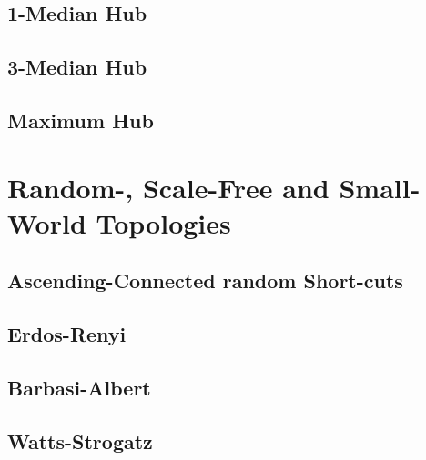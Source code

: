 \documentclass[Bachelorarbeit.tex]{subfiles}
\begin{document}
\subsection{1-Median Hub}
\subsection{3-Median Hub}
\subsection{Maximum Hub}



\section{Random-, Scale-Free and Small-World Topologies}
\subsection{Ascending-Connected random Short-cuts}
\subsection{Erdos-Renyi}
\subsection{Barbasi-Albert}
\subsection{Watts-Strogatz}
\end{document}
